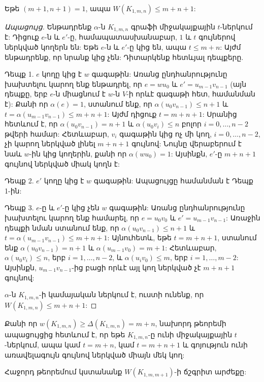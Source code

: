 \begin{theorem}
\label{upperBound}
Եթե $(m+1,n+1)=1$, ապա $W(K_{1,m,n}) \leq m+n+1$:
\end{theorem}
\begin{proof}[Ապացույց]
Ենթադրենք $\alpha$-ն $K_{1,m,n}$ գրաֆի միջակայքային $t$-ներկում է: Դիցուք $e$-ն և $e'$-ը, համապատասխանաբար, $1$ և $t$ գույներով ներկված կողերն են: Եթե $e$-ն և $e'$-ը կից են, ապա $t \leq m+n$: Այժմ ենթադրենք, որ նրանք կից չեն: Դիտարկենք հետևյալ դեպքերը.
\begin{description}
\item{Դեպք 1.} $e$ կողը կից է $w$ գագաթին: Առանց ընդհանրությունը խախտելու կարող ենք ենթադրել, որ $e=wu_0$ և $e'=u_{m-1}v_{n-1}$ (այն դեպքը, երբ $e$-ն միացնում է $w$-ն $V$-ի որևէ գագաթի հետ, համանման է): Քանի որ $\alpha(e)=1$, ստանում ենք, որ $\alpha(u_0v_{n-1}) \leq n+1$ և $t=\alpha(u_{m-1}v_{n-1}) \leq m+n+1$: Այժմ դիցուք $t=m+n+1$: Սրանից հետևում է, որ $\alpha(u_0v_{n-1})=n+1$ և $\alpha(u_0v_i)\leq n$ բոլոր $i=0,\ldots,n-2$ թվերի համար: Հետևաբար, $v_i$ գագաթին կից ոչ մի կող, $i=0,\ldots,n-2$, չի կարող ներկված լինել $m+n+1$ գույնով: Նույնը վերաբերում է նաև $w$-ին կից կողերին, քանի որ $\alpha(wu_0)=1$: Այսինքն, $e'$-ը $m+n+1$ գույնով ներկված միակ կողն է:
\item{Դեպք 2.} $e'$ կողը կից է $w$ գագաթին: Ապացույցը համանման է Դեպք 1-ին:
\item{Դեպք 3.} $e$-ը և $e'$-ը կից չեն $w$ գագաթին: Առանց ընդհանրությունը խախտելու կարող ենք համարել, որ $e=u_0v_0$ և $e'=u_{m-1}v_{n-1}$: Առաջին դեպքի նման ստանում ենք, որ $\alpha(u_0v_{n-1}) \leq n+1$ և $t=\alpha(u_{m-1}v_{n-1}) \leq m+n+1$: Այնուհետև, եթե $t=m+n+1$, ստանում ենք $\alpha(u_0v_{n-1})=n+1$ և $\alpha(u_{m-1}v_0)=m+1$: Հետևաբար, $\alpha(u_0v_i)\leq n$, երբ $i=1,\ldots,n-2$, և $\alpha(u_iv_0) \leq m$, երբ $i=1,\ldots,m-2$: Այսինքն, $u_{m-1}v_{n-1}$-ից բացի որևէ այլ կող ներկված չէ $m+n+1$ գույնով: 
\end{description}
$\alpha$-ն $K_{1,m,n}$-ի կամայական ներկում է, ուստի ունենք, որ $W(K_{1,m,n}) \leq m+n+1$:
\end{proof}

\begin{remark}
\label{uniqueMaximum}
Քանի որ $w(K_{1,m,n}) \geq \Delta(K_{1,m,n}) = m+n$, նախորդ թեորեմի ապացույցից հետևում է, որ եթե $K_{1,m,n}$-ը ունի միջակայքային $t$-ներկում, ապա կամ $t=m+n$, կամ $t=m+n+1$ և գոյություն ունի առավելագույն գույնով ներկված միայն մեկ կող:
\end{remark}

Հաջորդ թեորեմում կստանանք $W(K_{1,m,m+1})$-ի ճշգրիտ արժեքը:

